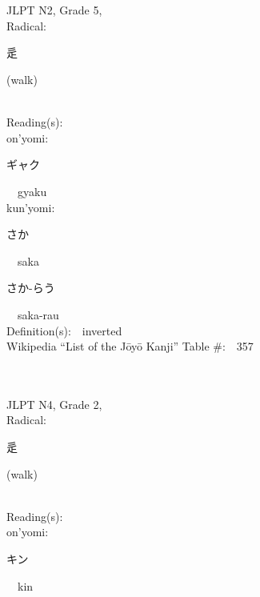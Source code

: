 \begin{multicols}{2}
\ \ \\
{\fontsize{34pt}{40pt}  }\ \ \\  %
{JLPT N2, Grade 5, \\Radical:\ \ {\begin{CJK}{UTF8}{min} 辵 \end{CJK}} (walk) } \\
Reading(s):\ \ \\
{\hspace*{1em}}on'yomi:\ \ \\
{\hspace*{2em}}{\begin{CJK}{UTF8}{min} ギャク \end{CJK}}\ \ gyaku\ \ \\
{\hspace*{1em}}kun'yomi:\ \ \\
{\hspace*{2em}}{\begin{CJK}{UTF8}{min} さか \end{CJK}}\ \ saka\ \ \\
{\hspace*{2em}}{\begin{CJK}{UTF8}{min} さか-らう \end{CJK}}\ \ saka-rau\ \ \\
Definition(s):\ \ inverted \\
Wikipedia ``List of the J\=oy\=o Kanji'' Table \#:\ \ 357 \\
\ \ \\
{\fontsize{34pt}{40pt}  }\ \ \\  %
{JLPT N4, Grade 2, \\Radical:\ \ {\begin{CJK}{UTF8}{min} 辵 \end{CJK}} (walk) } \\
Reading(s):\ \ \\
{\hspace*{1em}}on'yomi:\ \ \\
{\hspace*{2em}}{\begin{CJK}{UTF8}{min} キン \end{CJK}}\ \ kin\ \ \\

\end{multicols}
